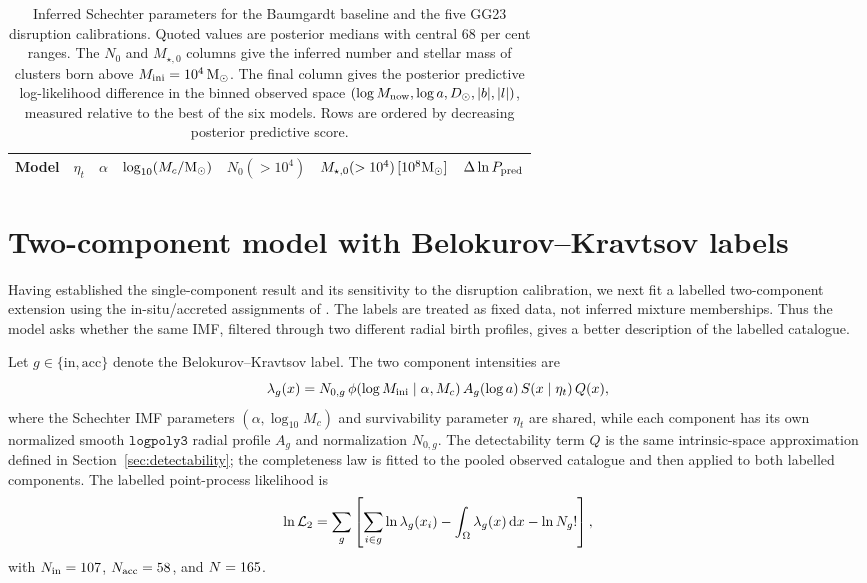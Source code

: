 \documentclass[fleqn,usenatbib]{mnras}
\begin{document}
\begin{table}
    \centering
    \caption{Inferred Schechter parameters for the Baumgardt baseline and the five GG23 disruption calibrations. Quoted values are posterior medians with central 68 per cent ranges. The $N_0$ and $M_{\star,0}$ columns give the inferred number and stellar mass of clusters born above $M_{\rm ini}=10^4\,{\rm M}_\odot$. The final column gives the posterior predictive log-likelihood difference in the binned observed space $(\log M_{\rm now},\log a,D_\odot,|b|,|l|)$, measured relative to the best of the six models. Rows are ordered by decreasing posterior predictive score.}
    \label{tab:gg23_imf_comparison}
    \begin{tabular}{lcccccc}
        \hline
        Model & $\eta_t$ & $\alpha$ & $\log_{10}(M_c/{\rm M}_\odot)$ & $N_0(>10^4)$ & $M_{\star,0}(>10^4)\,[10^8{\rm M}_\odot]$ & $\Delta\ln P_{\rm pred}$ \\
        \hline
        
    \end{tabular}
\end{table}

\clearpage

\section{Two-component model with Belokurov--Kravtsov labels}\label{sec:two_component}
Having established the single-component result and its sensitivity to the disruption calibration, we next fit a labelled two-component extension using the in-situ/accreted assignments of \citet{BelokurovKravtsov2024}. The labels are treated as fixed data, not inferred mixture memberships. Thus the model asks whether the same IMF, filtered through two different radial birth profiles, gives a better description of the labelled catalogue.

Let $g\in\{\mathrm{in},\mathrm{acc}\}$ denote the Belokurov--Kravtsov label. The two component intensities are
\begin{equation}
\lambda_g(x)
=
N_{0,g}\,\phi(\log M_{\rm ini}\mid \alpha,M_c)\,
A_g(\log a)\,S(x\mid\eta_t)\,Q(x),
\end{equation}
where the Schechter IMF parameters $(\alpha,\log_{10}M_c)$ and survivability parameter $\eta_t$ are shared, while each component has its own normalized smooth $\texttt{logpoly3}$ radial profile $A_g$ and normalization $N_{0,g}$. The detectability term $Q$ is the same intrinsic-space approximation defined in Section~\ref{sec:detectability}; the completeness law is fitted to the pooled observed catalogue and then applied to both labelled components. The labelled point-process likelihood is
\begin{equation}
\ln \mathcal{L}_{2}
=
\sum_g
\left[
\sum_{i\in g}\ln\lambda_g(x_i)
-
\int_\Omega \lambda_g(x)\,{\rm d}x
-
\ln N_g!
\right],
\end{equation}
with $N_{\rm in}=107$, $N_{\rm acc}=58$, and $N=165$.
\end{document}
